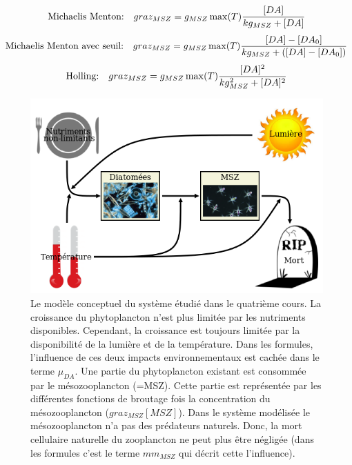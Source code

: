 {\begin{equation}
  \text{Michaelis Menton:~~~}
  graz_{MSZ} = g_{MSZ} \max(T) {{[DA]}\over{kg_{MSZ}+[DA]}}
  \label{eq:partie1GrazMic}
\end{equation}
\begin{equation}
  \text{Michaelis Menton avec seuil:~~~}
  graz_{MSZ} = g_{MSZ} \max(T) {{[DA]-[DA_0]}\over{kg_{MSZ}+([DA]-[DA_0])}}
  \label{eq:partie1GrazMicSeul}
\end{equation}
\begin{equation}
  \text{Holling:~~~}
  graz_{MSZ} = g_{MSZ} \max(T) {{[DA]^2}\over{kg_{MSZ}^2+[DA]^2}}
  \label{eq:partie1GrazHol}
\end{equation}

\begin{figure}[h!]
  \includegraphics[width=\textwidth]{partie1/diagrammeConceptuel.png}
  \caption{Le modèle conceptuel du système étudié dans le quatrième cours. La croissance du phytoplancton
n'est plus limitée par les nutriments disponibles. Cependant, la croissance est toujours limitée par la
disponibilité de la lumière et de la température. Dans les formules, l'influence de ces deux impacts
environnementaux est cachée dans le terme $\mu_{DA}$. Une partie du phytoplancton existant est consommée
par le mésozooplancton (=MSZ). Cette partie est représentée par les différentes fonctions de broutage
fois la concentration du mésozooplancton ($graz_{MSZ}[MSZ]$). Dans le système modélisée
le mésozooplancton n'a pas des prédateurs naturels. Donc, la mort cellulaire naturelle du zooplancton ne peut
plus être négligée (dans les formules c'est le terme $mm_{MSZ}$ qui décrit cette l'influence).
}
  \label{fig:partie1DiagConcept}
\end{figure}

}
